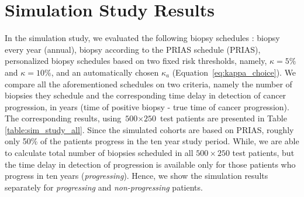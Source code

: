 \section{Simulation Study Results}

In the simulation study, we evaluated the following biopsy schedules \citep{loeb2014heterogeneity, inoue2018comparative}: biopsy every year (annual), biopsy according to the PRIAS schedule (PRIAS), personalized biopsy schedules based on two fixed risk thresholds, namely, $\kappa=5\%$ and $\kappa=10\%$, and an automatically chosen $\kappa_a$ (Equation~\ref{eq:kappa_choice}). We compare all the aforementioned schedules on two criteria, namely the number of biopsies they schedule and the corresponding time delay in detection of cancer progression, in years (time of positive biopsy - true time of cancer progression). The corresponding results, using ${\mbox{500} \times \mbox{250}}$ test patients are presented in Table \ref{table:sim_study_all}. Since the simulated cohorts are based on PRIAS, roughly only 50\% of the patients progress in the ten year study period. While, we are able to calculate total number of biopsies scheduled in all $500 \times 250$ test patients, but the time delay in detection of progression is available only for those patients who progress in ten years (\textit{progressing}). Hence, we show the simulation results separately for \textit{progressing} and \textit{non-progressing} patients.

